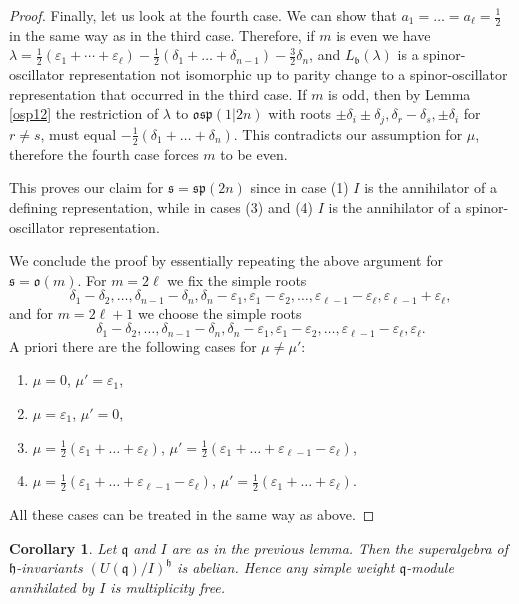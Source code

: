 \documentclass[12pt]{amsart}
\makeatletter
\def\@putname#1#2#3#4{\def\@@ref{#3}\let\old@bf\bf
        \def\bf##1{\old@bf\if?\noexpand##1?{#4}\else##1\fi}%
	#1{#2}%
        \let\bf\old@bf}
\def\@putname#1#2#3#4{\def\@@ref{#3}\let\old@bf\bf	%
	\let\old@reset@font\reset@font			%
        \def\bf##1{\old@bf\if?\noexpand##1?{#4}\else##1\fi}%
	\def\reset@font##1##2{\old@reset@font##1\if?\noexpand##2?{#4}\else##2\fi}#1{#2}%
        \let\bf\old@bf\let\reset@font\old@reset@font}
\let\my@ref=\ref
\def\ref#1{\@putname\my@ref{#1}{#1}{\tiny\rm\@@ref}}
\theoremstyle{plain} %
\numberwithin{equation}{section}
\theoremstyle{definition}
\theoremstyle{remark}
\theoremstyle{plain} %
\newtheorem{corollary}[definition]{Corollary}
\renewcommand{\sp}{\mathfrak{sp}}
\newcommand{\gs}{\mathfrak{s}}
\newcommand{\gh}{\mathfrak{h}}
\def\gb{\mathfrak{b}}
\def\gh{\mathfrak{h}}
\def\gq{\mathfrak{q}}
\def\gs{\mathfrak{s}}
\makeatother
\begin{document}
\begin{proof}
  Finally, let us look at the fourth case. We can show that $a_1=\dots=a_\ell=\frac{1}{2}$ in the same way as in the third case. Therefore, if $m$ is even we have $\lambda = \frac{1}{2} \left(\varepsilon_1+\cdots +\varepsilon_\ell\right)  -\frac{1}{2}(\delta_1+\dots+\delta_{n-1})-\frac{3}{2}\delta_n$, and 
   $L_{\gb}(\lambda)$ is a spinor-oscillator representation not isomorphic up to parity change to a spinor-oscillator representation that occurred in the third case. 
  If $m$ is odd, then by Lemma \ref{osp12} the restriction of  $\lambda$  to $\mathfrak{osp}(1|2n)$ with roots $\pm \delta_i \pm \delta_j, \delta_r - \delta_s, \pm \delta_i$ for $r \neq s$,
     must equal $-\frac{1}{2}(\delta_1+\dots+\delta_{n})$. This contradicts our assumption for $\mu$,  therefore the fourth case forces $m$ to be even. 
  
  This proves our claim for $\mathfrak s = \sp (2n)$ since in case (1) $I$ is the annihilator of a defining representation, while in cases (3) and (4) $I$ is the annihilator of a spinor-oscillator representation.
  
We conclude the proof by essentially repeating the above argument  for $\gs=\mathfrak{o}(m)$.
For  $m=2\ell$ we fix the simple roots
  $$\delta_1-\delta_2,\dots,\delta_{n-1}-\delta_n,\delta_n-\varepsilon_1,\varepsilon_1-\varepsilon_2,\dots,\varepsilon_{\ell-1}-\varepsilon_\ell,\varepsilon_{\ell-1}+\varepsilon_\ell,$$
and for $m=2\ell+1$ we choose  the simple roots
 $$\delta_1-\delta_2,\dots,\delta_{n-1}-\delta_n,\delta_n-\varepsilon_1,\varepsilon_1-\varepsilon_2,\dots,\varepsilon_{\ell-1}-\varepsilon_\ell,\varepsilon_\ell.$$
A priori there are the following cases for $\mu \neq \mu'$:
 \begin{enumerate}
  \item $\mu=0$, $\mu'=\varepsilon_1$,
    \item $\mu=\varepsilon_1$, $\mu'=0$,
\item $\mu=\frac{1}{2}(\varepsilon_1+\dots+\varepsilon_{\ell})$, $\mu'=\frac{1}{2}(\varepsilon_1+\dots+\varepsilon_{\ell-1}-\varepsilon_{\ell})$,
\item  $\mu=\frac{1}{2}(\varepsilon_1+\dots+\varepsilon_{\ell-1}-\varepsilon_{\ell})$, $\mu'=\frac{1}{2}(\varepsilon_1+\dots+\varepsilon_{\ell})$.
\end{enumerate}
All these cases can be treated in the same way as above.  \end{proof}

  \begin{corollary} \label{cor-mult-free}Let  $\gq$ and $I$ are as in the previous lemma. Then the superalgebra of $\gh$-invariants $\left(U(\gq)/I\right)^{\gh}$ is abelian. Hence any simple weight $\gq$-module annihilated by $I$ is multiplicity free.
  \end{corollary}
\end{document}
